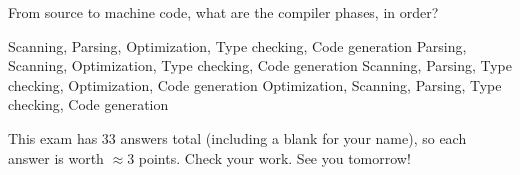 \documentclass[addpoints]{exam}
\begin{document}
\begin{questions}
\answerline

\question From source to machine code, what are the compiler phases, in order?

\begin{choices}
\choice Scanning, Parsing, Optimization,  Type checking, Code generation
\choice Parsing, Scanning, Optimization, Type checking, Code generation
\choice Scanning, Parsing, Type checking, Optimization, Code generation
\choice Optimization, Scanning, Parsing, Type checking, Code generation
\end{choices}

\answerline

\end{questions}

This exam has 33 answers total (including a blank for your name), so each answer is worth $\approx 3$ points. Check your work. See you tomorrow!
\end{document}
